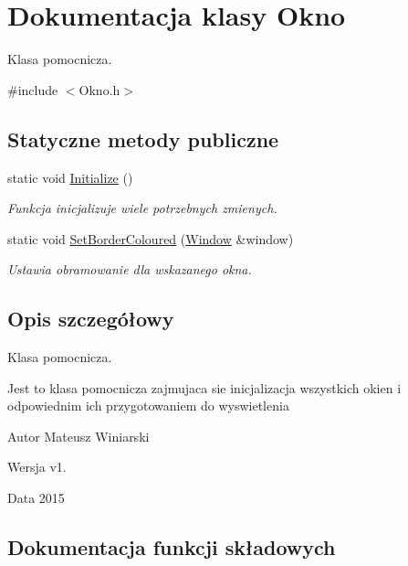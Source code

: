 \hypertarget{class_okno}{}\section{Dokumentacja klasy Okno}
\label{class_okno}


Klasa pomocnicza.  




{\ttfamily \#include $<$Okno.\+h$>$}

\subsection*{Statyczne metody publiczne}
\begin{DoxyCompactItemize}
\item 
static void \hyperlink{class_okno_a48a5b9af8dbf76e60be2e5d464f62d1e}{Initialize} ()
\begin{DoxyCompactList}\small\item\em Funkcja inicjalizuje wiele potrzebnych zmienych. \end{DoxyCompactList}\item 
static void \hyperlink{class_okno_a3ec5330f3b091006670cac8e2b12442e}{Set\+Border\+Coloured} (\hyperlink{class_window}{Window} \&window)
\begin{DoxyCompactList}\small\item\em Ustawia obramowanie dla wskazanego okna. \end{DoxyCompactList}\end{DoxyCompactItemize}


\subsection{Opis szczegółowy}
Klasa pomocnicza. 

Jest to klasa pomocnicza zajmujaca sie inicjalizacja wszystkich okien i odpowiednim ich przygotowaniem do wyswietlenia \begin{DoxyAuthor}{Autor}
Mateusz Winiarski 
\end{DoxyAuthor}
\begin{DoxyVersion}{Wersja}
v1. 
\end{DoxyVersion}
\begin{DoxyDate}{Data}
2015 
\end{DoxyDate}


\subsection{Dokumentacja funkcji składowych}
\hypertarget{class_okno_a48a5b9af8dbf76e60be2e5d464f62d1e}{}
